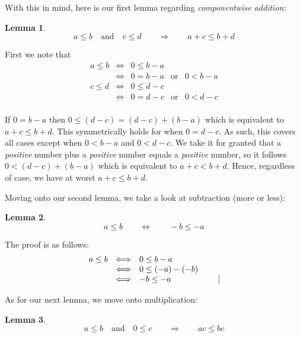 \documentclass[twoside]{article}
\newtheorem{lemma}{Lemma}[section]
\newenvironment{proof}[1][Proof]{\begin{trivlist}
\item[\hskip \labelsep {\bfseries #1}]}{\end{trivlist}}
\newcommand{\qed}{\nobreak \ifvmode \relax \else
      \ifdim\lastskip<1.5em \hskip-\lastskip
      \hskip1.5em plus0em minus0.5em \fi \nobreak
      \vrule height0.5em width0.5em depth0.25em\fi}
\begin{document}
With this in mind, here is our first lemma regarding \emph{componentwise addition}:

\begin{lemma} {$$ a\le b\quad\mbox{and}\quad c\le d\qquad\Longrightarrow\qquad a+c\le b+d $$}
\end{lemma}

\begin{proof}
First we note that
$$ \begin{array}{rclll}
a\le b	&	\Longleftrightarrow	&	0\le b-a	&			&		\\
	&	\Longleftrightarrow	&	0=b-a		&	\mbox{or}	& 	0 < b-a	\\
c\le d	&	\Longleftrightarrow	&	0\le d-c	&			&		\\
	&	\Longleftrightarrow	&	0=d-c		&	\mbox{or}	& 	0 < d-c	\\
\end{array} $$

If $ 0=b-a $ then $ 0\le (d-c)=(d-c)+(b-a) $ which is equivalent to $ a+c\le b+d $. This symmetrically holds for when
$ 0=d-c $. As such, this covers all cases except when $ 0 < b-a $ and $ 0 < d-c $. We take it for granted that a
\emph{positive} number plus a \emph{positive} number equals a \emph{positive} number, so it follows $ 0 < (d-c)+(b-a) $
which is equivalent to $ a+c < b+d $.  Hence, regardless of case, we have at worst $ a+c\le b+d $.\qed

\end{proof}

Moving onto our second lemma, we take a look at subtraction (more or less):

\begin{lemma} $$ a\le b\qquad\Longleftrightarrow\qquad -b\le -a $$
\end{lemma}

\begin{proof}
The proof is as follows:
$$ \begin{array}{rcll}
a\le b	&	\Longleftrightarrow	&	0\le b-a	&		\\
	&	\Longleftrightarrow	&	0\le (-a)-(-b)	&		\\
	&	\Longleftrightarrow	&	-b\le -a	&	\qed	\\
\end{array} $$
\end{proof}

\newpage

As for our next lemma, we move onto multiplication:

\begin{lemma} $$ a\le b\quad\mbox{and}\quad 0\le c\qquad\Longrightarrow\qquad ac\le bc $$
\end{lemma}
\end{document}

